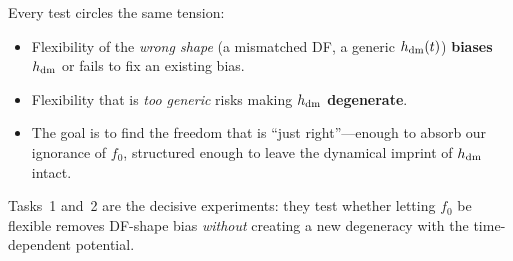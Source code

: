 \documentclass[11pt]{article}
\newcommand{\hdm}{h_{\rm dm}}
\begin{document}
Every test circles the same tension:
\begin{itemize}[nosep]
  \item Flexibility of the \emph{wrong shape} (a mismatched DF, a generic
        $\hdm(t)$) \textbf{biases} $\hdm$ or fails to fix an existing bias.
  \item Flexibility that is \emph{too generic} risks making $\hdm$
        \textbf{degenerate}.
  \item The goal is to find the freedom that is ``just right''---enough to absorb
        our ignorance of $f_0$, structured enough to leave the dynamical
        imprint of $\hdm$ intact.
\end{itemize}
Tasks~1 and~2 are the decisive experiments: they test whether letting $f_0$ be
flexible removes DF-shape bias \emph{without} creating a new degeneracy with the
time-dependent potential.
\end{document}
